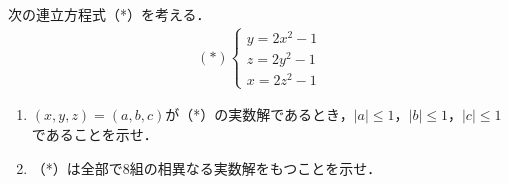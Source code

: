 \documentclass[../../main.tex]{subfiles}
\begin{document}
次の連立方程式（*）を考える．
\begin{align*}
  (*)
  \begin{cases}
    y=2x^2-1 \\
    z=2y^2-1 \\
    x=2z^2-1
  \end{cases}
\end{align*}
\begin{enumerate}
  \item $(x,y,z)=(a,b,c)$が（*）の実数解であるとき，$|a|\le 1$，$|b|\le 1$，$|c|\le 1$であることを示せ．
  \item （*）は全部で$8$組の相異なる実数解をもつことを示せ．
\end{enumerate}
\end{document}
